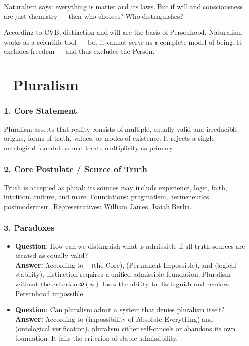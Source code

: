 \documentclass[12pt]{article}
\begin{document}
Naturalism says: everything is matter and its laws. But if will and consciousness are just chemistry — then who chooses? Who distinguishes?

According to CVB, distinction and will are the basis of Personhood. Naturalism works as a scientific tool — but it cannot serve as a complete model of being. It excludes freedom — and thus excludes the Person.

\section*{🔷 Pluralism}

\subsubsection*{1. Core Statement}

Pluralism asserts that reality consists of multiple, equally valid and irreducible origins, forms of truth, values, or modes of existence. It rejects a single ontological foundation and treats multiplicity as primary.

\subsubsection*{2. Core Postulate / Source of Truth}

Truth is accepted as plural: its sources may include experience, logic, faith, intuition, culture, and more. Foundations: pragmatism, hermeneutics, postmodernism. Representatives: William James, Isaiah Berlin.

\subsubsection*{3. Paradoxes}

\begin{itemize}
\item \textbf{Question:} How can we distinguish what is admissible if all truth sources are treated as equally valid?  
\\ \textbf{Answer:} According to \text{[1]}–\text{[3]} (the Core), \text{[4.1]} (Permanent Impossible), and \text{[11.1]} (logical stability), distinction requires a unified admissible foundation. Pluralism without the criterion $\Phi(\psi)$ loses the ability to distinguish and renders Personhood impossible.

\item \textbf{Question:} Can pluralism admit a system that denies pluralism itself?  
\\ \textbf{Answer:} According to \text{[2]} (impossibility of Absolute Everything) and \text{[11.1.1.4]} (ontological verification), pluralism either self-cancels or abandons its own foundation. It fails the criterion of stable admissibility.
\end{itemize}
\end{document}
